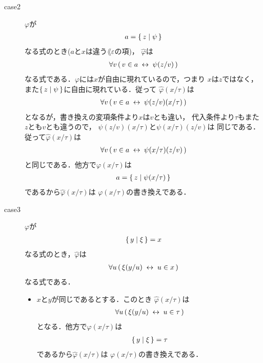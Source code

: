 \begin{metaprf}[第一]
\begin{description}
\begin{description}
					\item[case2] $\varphi$が
						\begin{align}
							a = \{\, z \mid \psi\, \}
						\end{align}
						なる式のとき($a$と$x$は違う$\lang{\varepsilon}$の項)，
						$\widehat{\varphi}$は
						\begin{align}
							\forall v\, (\, v \in a \hspace{0.25em}\leftrightarrow\hspace{0.25em} \psi(z/v)\, )
						\end{align}
						なる式である．$\varphi$には$x$が自由に現れているので，つまり
						$x$は$z$ではなく，また$\{\, z \mid \psi\, \}$に自由に現れている．従って
						$\widehat{\varphi}(x/\tau)$は
						\begin{align}
							\forall v\, (\, v \in a \hspace{0.25em}\leftrightarrow\hspace{0.25em} \psi(z/v)(x/\tau)\, )
						\end{align}
						となるが，書き換えの変項条件より$x$は$v$とも違い，
						代入条件より$\tau$もまた$z$とも$v$とも違うので，
						$\psi(z/v)(x/\tau)$と$\psi(x/\tau)(z/v)$は
						同じである．従って$\widehat{\varphi}(x/\tau)$は
						\begin{align}
							\forall v\, (\, v \in a \hspace{0.25em}\leftrightarrow\hspace{0.25em} \psi(x/\tau)(z/v)\, )
						\end{align}
						と同じである．他方で$\varphi(x/\tau)$は
						\begin{align}
							a = \{\, z \mid \psi(x/\tau)\, \}
						\end{align}
						であるから$\widehat{\varphi}(x/\tau)$は
						$\varphi(x/\tau)$の書き換えである．
					
					\item[case3] $\varphi$が
						\begin{align}
							\{\, y \mid \xi\, \} = x
						\end{align}
						なる式のとき，$\widehat{\varphi}$は
						\begin{align}
							\forall u\, (\, \xi(y/u) \hspace{0.25em}\leftrightarrow\hspace{0.25em} u \in x\, )
						\end{align}
						なる式である．
						\begin{itemize}
							\item $x$と$y$が同じであるとする．このとき
								$\widehat{\varphi}(x/\tau)$は
								\begin{align}
									\forall u\, (\, \xi(y/u) \hspace{0.25em}\leftrightarrow\hspace{0.25em} u \in \tau\, )
								\end{align}
								となる．他方で$\varphi(x/\tau)$は
								\begin{align}
									\{\, y \mid \xi\, \} = \tau
								\end{align}
								であるから$\widehat{\varphi}(x/\tau)$は
								$\varphi(x/\tau)$の書き換えである．
								

\end{itemize}
\end{description}
\end{description}
\end{metaprf}
